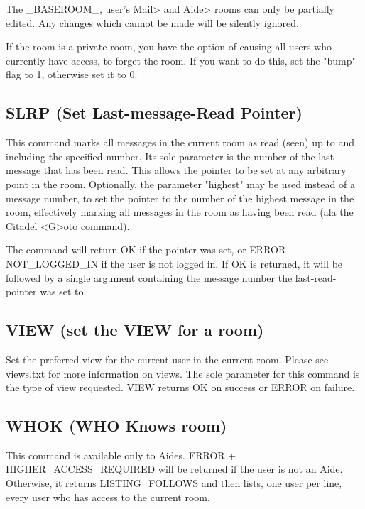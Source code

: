  The _BASEROOM_, user's Mail> and Aide> rooms can only be partially edited.
Any changes which cannot be made will be silently ignored.

 If the room is a private room, you have the option of causing all users who
currently have access, to forget the room.  If you want to do this, set the
"bump" flag to 1, otherwise set it to 0.



\subsection{SLRP (Set Last-message-Read Pointer)}

 This command marks all messages in the current room as read (seen) up to and
including the specified number.  Its sole parameter is the number of the last
message that has been read.  This allows the pointer to be set at any
arbitrary point in the room.  Optionally, the parameter "highest" may be used
instead of a message number, to set the pointer to the number of the highest
message in the room, effectively marking all messages in the room as having
been read (ala the Citadel <G>oto command).

 The command will return OK if the pointer was set, or ERROR + NOT_LOGGED_IN
if the user is not logged in.  If OK is returned, it will be followed by a
single argument containing the message number the last-read-pointer was set to.



\subsection{VIEW (set the VIEW for a room)}

 Set the preferred view for the current user in the current room.  Please see
views.txt for more information on views.  The sole parameter for this command
is the type of view requested.  VIEW returns OK on success or ERROR on failure.



\subsection{WHOK (WHO Knows room)}

 This command is available only to Aides.  ERROR + HIGHER_ACCESS_REQUIRED
will be returned if the user is not an Aide.  Otherwise, it returns
LISTING_FOLLOWS and then lists, one user per line, every user who has
access to the current room.


